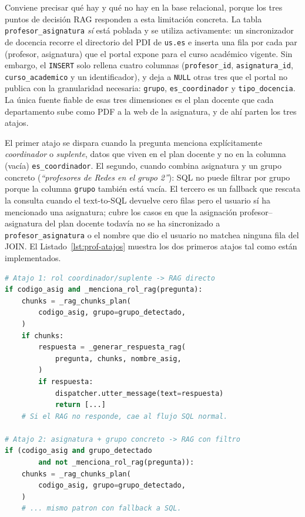 Conviene precisar qué hay y qué no hay en la base relacional, porque los tres puntos de decisión RAG responden a esta limitación concreta. La tabla \texttt{profesor\_asignatura} \textit{sí} está poblada y se utiliza activamente: un sincronizador de docencia recorre el directorio del PDI de \texttt{us.es} e inserta una fila por cada par (profesor, asignatura) que el portal expone para el curso académico vigente. Sin embargo, el \texttt{INSERT} solo rellena cuatro columnas (\texttt{profesor\_id}, \texttt{asignatura\_id}, \texttt{curso\_academico} y un identificador), y deja a \texttt{NULL} otras tres que el portal no publica con la granularidad necesaria: \texttt{grupo}, \texttt{es\_coordinador} y \texttt{tipo\_docencia}. La única fuente fiable de esas tres dimensiones es el plan docente que cada departamento sube como PDF a la web de la asignatura, y de ahí parten los tres atajos.

El primer atajo se dispara cuando la pregunta menciona explícitamente \textit{coordinador} o \textit{suplente}, datos que viven en el plan docente y no en la columna (vacía) \texttt{es\_coordinador}. El segundo, cuando combina asignatura y un grupo concreto (\textit{``profesores de Redes en el grupo 2''}): SQL no puede filtrar por grupo porque la columna \texttt{grupo} también está vacía. El tercero es un fallback que rescata la consulta cuando el text-to-SQL devuelve cero filas pero el usuario sí ha mencionado una asignatura; cubre los casos en que la asignación profesor--asignatura del plan docente todavía no se ha sincronizado a \texttt{profesor\_asignatura} o el nombre que dio el usuario no matchea ninguna fila del JOIN. El Listado~\ref{lst:prof-atajos} muestra los dos primeros atajos tal como están implementados.

\begin{lstlisting}[language=python, basicstyle=\ttfamily\footnotesize, caption={Atajos a RAG en \texttt{ActionConsultaProfesor}.}, label={lst:prof-atajos}]
# Atajo 1: rol coordinador/suplente -> RAG directo
if codigo_asig and _menciona_rol_rag(pregunta):
    chunks = _rag_chunks_plan(
        codigo_asig, grupo=grupo_detectado,
    )
    if chunks:
        respuesta = _generar_respuesta_rag(
            pregunta, chunks, nombre_asig,
        )
        if respuesta:
            dispatcher.utter_message(text=respuesta)
            return [...]
    # Si el RAG no responde, cae al flujo SQL normal.

# Atajo 2: asignatura + grupo concreto -> RAG con filtro
if (codigo_asig and grupo_detectado
        and not _menciona_rol_rag(pregunta)):
    chunks = _rag_chunks_plan(
        codigo_asig, grupo=grupo_detectado,
    )
    # ... mismo patron con fallback a SQL.
\end{lstlisting}

